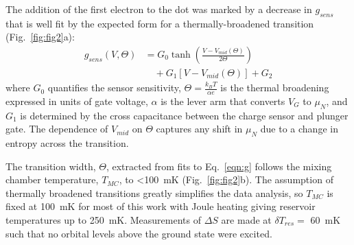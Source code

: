 \documentclass[twocolumn,showpacs,preprintnumbers,amsmath,amssymb,pra,aps,superscriptaddress]{revtex4-1}
\begin{document}
The addition of the first electron to the dot was marked by a decrease in $g_{sens}$ that is well fit by the expected form for a thermally-broadened transition (Fig.~\ref{fig:fig2}a):
%
\begin{align}
\label{eqn:g}
        g_{sens}(V,\Theta) &= G_0 \tanh\left(\frac{V-V_{mid}(\Theta)}{2\Theta}\right)  \\
                        &\quad + G_1\left[V-V_{mid}(\Theta)\right] + G_2 \nonumber
\end{align}
%
where $G_0$ quantifies the sensor sensitivity, $\Theta = \frac{k_B T}{\alpha e}$ is the thermal broadening expressed in units of gate voltage, $\alpha$ is the lever arm that converts $V_G$ to $\mu_{N}$, and $G_1$ is determined by the cross capacitance between the charge sensor and plunger gate. The dependence of $V_{mid}$ on $\Theta$ captures any shift in $\mu_{N}$ due to a change in entropy across the transition.

The transition width, $\Theta$, extracted from fits to Eq.~\ref{eqn:g} follows the mixing chamber temperature, $T_{MC}$, to \SI{<100}{\milli\kelvin} (Fig.~\ref{fig:fig2}b). The assumption of thermally broadened transitions greatly simplifies the data analysis, so $T_{MC}$ is fixed at \SI{100}{\milli\kelvin} for most of this work with Joule heating giving reservoir temperatures up to \SI{250}{\milli\kelvin}. Measurements of $\Delta S$ are made at $\delta T_{res} = $ \SI{60}{\milli\kelvin} such that no orbital levels above the ground state were excited.
\end{document}
